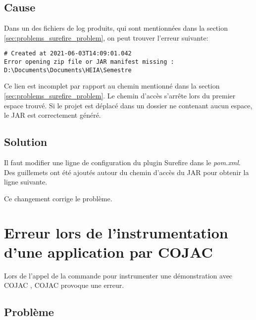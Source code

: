 \begin{minipage}{\linewidth}
\label{fig:problems_maven_skip_tests}
\end{minipage}

\subsection{Cause}

Dans un des fichiers de log produits, qui sont mentionnées dans la section \ref{sec:problems_surefire_problem}, on peut trouver l'erreur suivante:

\begin{verbatim}
# Created at 2021-06-03T14:09:01.042
Error opening zip file or JAR manifest missing : D:\Documents\Documents\HEIA\Semestre
\end{verbatim}

Ce lien est incomplet par rapport au chemin mentionné dans la section \ref{sec:problems_surefire_problem}. Le chemin d'accès s'arrête lors du premier espace trouvé. Si le projet est déplacé dans un dossier ne contenant aucun espace, le JAR est correctement généré.

\subsection{Solution}

Il faut modifier une ligne de configuration du plugin Surefire dans le \textit{pom.xml}. Des guillemets ont été ajoutés autour du chemin d'accès du JAR pour obtenir la ligne suivante.

Ce changement corrige le problème.

\section{Erreur lors de l'instrumentation d'une application par COJAC}

Lors de l'appel de la commande pour instrumenter une démonstration avec COJAC \cite{COJAC}, COJAC \cite{COJAC} provoque une erreur.

\subsection{Problème}

